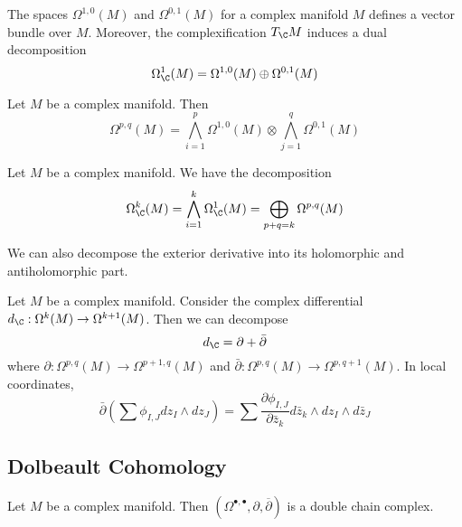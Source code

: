 \documentclass[a4paper]{article}
\begin{document}
\begin{prp}{}{} The spaces $\Omega^{1,0}(M)$ and $\Omega^{0,1}(M)$ for a complex manifold $M$ defines a vector bundle over $M$. Moreover, the complexification $T_{\C}M$ induces a dual decomposition $$\Omega_{\C}^1(M)=\Omega^{1,0}(M)\oplus\Omega^{0,1}(M)$$
\end{prp}

\begin{prp}{}{} Let $M$ be a complex manifold. Then $$\Omega^{p,q}(M)=\bigwedge_{i=1}^p\Omega^{1,0}(M)\otimes\bigwedge_{j=1}^q\Omega^{0,1}(M)$$
\end{prp}

\begin{lmm}{}{} Let $M$ be a complex manifold. We have the decomposition $$\Omega_{\C}^k(M)=\bigwedge_{i=1}^k\Omega_{\C}^1(M)=\bigoplus_{p+q=k}\Omega^{p,q}(M)$$
\end{lmm}

We can also decompose the exterior derivative into its holomorphic and antiholomorphic part. 

\begin{lmm}{}{} Let $M$ be a complex manifold. Consider the complex differential $d_\C:\Omega^k(M)\to\Omega^{k+1}(M)$. Then we can decompose $$d_{\C}=\partial+\bar{\partial}$$ where $\partial:\Omega^{p,q}(M)\to\Omega^{p+1,q}(M)$ and $\bar{\partial}:\Omega^{p,q}(M)\to\Omega^{p,q+1}(M)$. In local coordinates, $$\bar{\partial}\left(\sum\phi_{I,J}dz_I\wedge dz_J\right)=\sum\frac{\partial \phi_{I,J}}{\partial \bar{z}_k}d\bar{z}_k\wedge dz_I\wedge d\bar{z}_J$$
\end{lmm}

\subsection{Dolbeault Cohomology}
\begin{prp}{}{} Let $M$ be a complex manifold. Then $(\Omega^{\bullet,\bullet},\partial,\overline{\partial})$ is a double chain complex. 
\end{prp}
\end{document}
